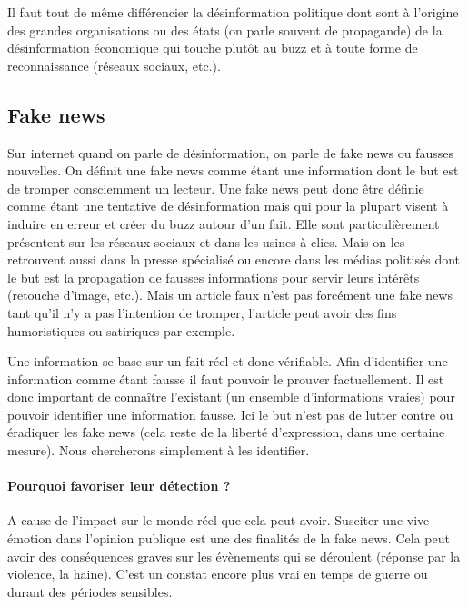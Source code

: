 Il faut tout de même différencier la désinformation politique dont sont à l'origine des grandes organisations ou des états (on parle souvent de propagande) de la désinformation économique qui touche plutôt au buzz et à toute forme de reconnaissance (réseaux sociaux, etc.).

\subsection{Fake news}

Sur internet quand on parle de désinformation, on parle de fake news ou fausses nouvelles. On définit une fake news comme étant une information dont le but est de tromper consciemment un lecteur. Une fake news peut donc être définie comme étant une tentative de désinformation mais qui pour la plupart visent à induire en erreur et créer du buzz autour d'un fait. Elle sont particulièrement présentent sur les réseaux sociaux et dans les usines à clics. Mais on les retrouvent aussi dans la presse spécialisé ou encore dans les médias politisés dont le but est la propagation de fausses informations pour servir leurs intérêts (retouche d'image, etc.).  Mais un article faux n'est pas forcément une fake news tant qu'il n'y a pas l'intention de tromper, l'article peut avoir des fins humoristiques ou satiriques par exemple.

Une information se base sur un fait réel et donc vérifiable. Afin d'identifier une information comme étant fausse il faut pouvoir le prouver factuellement. Il est donc important de connaître l'existant (un ensemble d'informations vraies) pour pouvoir identifier une information fausse. Ici le but n'est pas de lutter contre ou éradiquer les fake news (cela reste de la liberté d'expression, dans une certaine mesure). Nous chercherons simplement à les identifier.


\paragraph{Pourquoi favoriser leur détection ?} A cause de l'impact sur le monde réel que cela peut avoir. Susciter une vive émotion dans l'opinion publique est une des finalités de la fake news. Cela peut avoir des conséquences graves sur les évènements qui se déroulent (réponse par la violence, la haine). C'est un constat encore plus vrai en temps de guerre ou durant des périodes sensibles.

